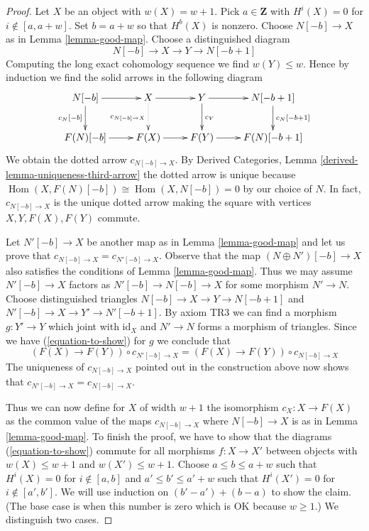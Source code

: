 \documentclass[10pt,a4paper]{amsart}
\theoremstyle{plain}
\theoremstyle{definition}
\theoremstyle{remark}
\numberwithin{equation}{subsection}
\def\Hom{\mathop{\mathrm{Hom}}\nolimits}
\begin{document}
\begin{proof}
\medskip\noindent
Let $X$ be an object with $w(X) = w + 1$. Pick $a \in \mathbf{Z}$ with
$H^i(X) = 0$ for $i \not \in [a, a + w]$. Set $b = a + w$ so that
$H^b(X)$ is nonzero. Choose $N[-b] \to X$ as in Lemma \ref{lemma-good-map}.
Choose a distinguished diagram
$$
N[-b] \to X \to Y \to N[-b + 1]
$$
Computing the long exact cohomology sequence we find
$w(Y) \leq w$. Hence by induction we find the solid arrows
in the following diagram
$$
\xymatrix{
N[-b] \ar[r] \ar[d]_{c_N[-b]} &
X \ar[r] \ar@{..>}[d]_{c_{N[-b] \to X}} &
Y \ar[r] \ar[d]^{c_Y} &
N[-b + 1] \ar[d]^{c_N[-b + 1]} \\
F(N)[-b] \ar[r] &
F(X) \ar[r] &
F(Y) \ar[r] &
F(N)[-b + 1]
}
$$
We obtain the dotted arrow $c_{N[-b] \to X}$.
By Derived Categories, Lemma \ref{derived-lemma-uniqueness-third-arrow}
the dotted arrow is unique because $\Hom(X, F(N)[-b]) \cong \Hom(X, N[-b]) = 0$
by our choice of $N$. In fact, $c_{N[-b] \to X}$ is the unique dotted
arrow making the square with vertices $X, Y, F(X), F(Y)$ commute.

\medskip\noindent
Let $N'[-b] \to X$ be another map as in Lemma \ref{lemma-good-map}
and let us prove that $c_{N[-b] \to X} = c_{N'[-b] \to X}$.
Observe that the map $(N \oplus N')[-b] \to X$ also satisfies the
conditions of Lemma \ref{lemma-good-map}.
Thus we may assume $N'[-b] \to X$ factors
as $N'[-b] \to N[-b] \to X$ for some morphism $N' \to N$.
Choose distinguished triangles $N[-b] \to X \to Y \to N[-b + 1]$ and
$N'[-b] \to X \to Y' \to N'[-b + 1]$. By axiom TR3 we can find
a morphism $g : Y' \to Y$ which joint with $\text{id}_X$ and $N' \to N$
forms a morphism of triangles. Since we have
(\ref{equation-to-show}) for $g$ we conclude that
$$
(F(X) \to F(Y)) \circ c_{N'[-b] \to X} = (F(X) \to F(Y)) \circ c_{N[-b] \to X}
$$
The uniqueness of $c_{N[-b] \to X}$ pointed out in the construction
above now shows that $c_{N'[-b] \to X} = c_{N[-b] \to X}$.

\medskip\noindent
Thus we can now define for $X$ of width $w + 1$ the isomorphism
$c_X : X \to F(X)$ as the common value of the maps $c_{N[-b] \to X}$
where $N[-b] \to X$ is as in Lemma \ref{lemma-good-map}. To finish
the proof, we have to show that the diagrams (\ref{equation-to-show})
commute for all morphisms $f : X \to X'$ between objects with $w(X) \leq w + 1$
and $w(X') \leq w + 1$. Choose $a \leq b \leq a + w$ such that
$H^i(X) = 0$ for $i \not \in [a, b]$ and
$a' \leq b' \leq a' + w$ such that $H^i(X') = 0$ for
$i \not \in [a', b']$. We will use induction on
$(b' - a') + (b - a)$ to show the claim. (The base case
is when this number is zero which is OK because $w \geq 1$.)
We distinguish two cases.


\end{proof}
\end{document}
